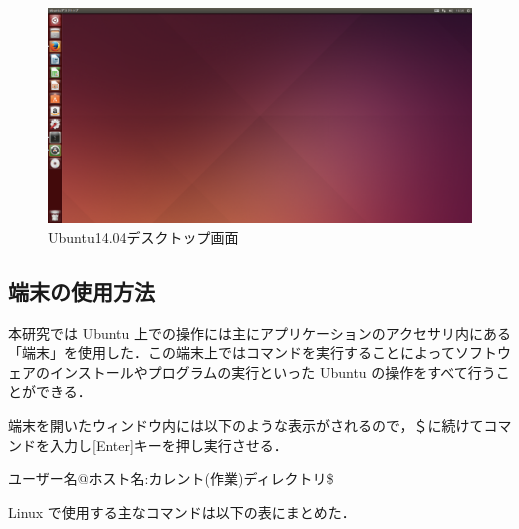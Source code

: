 \begin{figure}[htb]
\centering
\includegraphics[width=14cm]{ubuntugamen}
\caption{Ubuntu14.04デスクトップ画面}\label{図}
\end{figure}

\subsection{端末の使用方法}
本研究では Ubuntu 上での操作には主にアプリケーションのアクセサリ内にある「端末」を使用した．この端末上ではコマンドを実行することによってソフトウェアのインストールやプログラムの実行といった Ubuntu の操作をすべて行うことができる． 

端末を開いたウィンドウ内には以下のような表示がされるので，＄に続けてコマンドを入力し[Enter]キーを押し実行させる． 

ユーザー名@ホスト名:カレント(作業)ディレクトリ\$

Linux で使用する主なコマンドは以下の表にまとめた．
 
